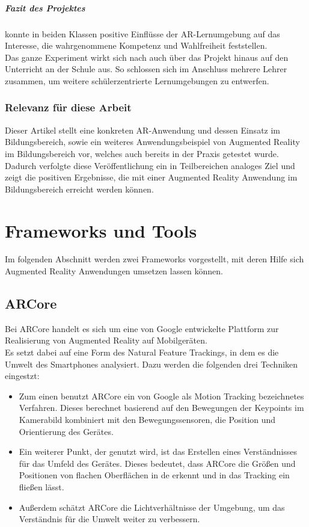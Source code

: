 \subparagraph{Fazit des Projektes}
\citeauthor{buchner:ar-geschichtsunterricht} konnte in beiden Klassen positive Einflüsse der AR-Lernumgebung auf das Interesse, die wahrgenommene Kompetenz und Wahlfreiheit feststellen.\\
Das ganze Experiment wirkt sich nach \citeauthor{buchner:ar-geschichtsunterricht} auch über das Projekt hinaus auf den Unterricht an der Schule aus. So schlossen sich im Anschluss mehrere Lehrer zusammen, um weitere schülerzentrierte Lernumgebungen zu entwerfen. \citep[Kapitel 5-6]{buchner:ar-geschichtsunterricht}

\subsubsection{Relevanz für diese Arbeit}
Dieser Artikel stellt eine konkreten AR-Anwendung und dessen Einsatz im Bildungsbereich, sowie ein weiteres Anwendungsbeispiel von Augmented Reality im Bildungsbereich vor, welches auch bereits in der Praxis getestet wurde. \\ Dadurch verfolgte diese Veröffentlichung ein in Teilbereichen analoges Ziel und zeigt die positiven Ergebnisse, die mit einer Augmented Reality Anwendung im Bildungsbereich erreicht werden können.

\section{Frameworks und Tools}
Im folgenden Abschnitt werden zwei Frameworks vorgestellt, mit deren Hilfe sich Augmented Reality Anwendungen umsetzen lassen können.

\subsection{ARCore}\label{sec:arcore}
Bei ARCore handelt es sich um eine von Google entwickelte Plattform zur Realisierung von Augmented Reality auf Mobilgeräten.\\
Es setzt dabei auf eine Form des Natural Feature Trackings, in dem es die Umwelt des Smartphones analysiert. Dazu werden die folgenden drei Techniken eingestzt:
\begin{itemize}
\item Zum einen benutzt ARCore ein von Google als Motion Tracking bezeichnetes Verfahren. Dieses berechnet basierend auf den Bewegungen der Keypoints im Kamerabild kombiniert mit den Bewegungssensoren, die Position und Orientierung des Gerätes.
\item Ein weiterer Punkt, der genutzt wird, ist das Erstellen eines Verständnisses für das Umfeld des Gerätes. Dieses bedeutet, dass ARCore die Größen und Positionen von flachen Oberflächen in de erkennt und in das Tracking ein fließen lässt.
\item Außerdem schätzt ARCore die Lichtverhältnisse der Umgebung, um das Verständnis für die Umwelt weiter zu verbessern.
\end{itemize}
\citep{android:arcore}

